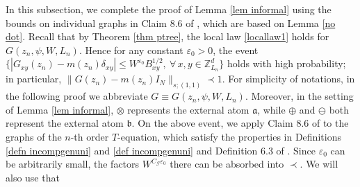 \documentclass{article}
\newcommand{\1}{\mathds{1}}
\numberwithin{equation}{section}
\newcommand{\be}{\begin{equation}}
\newcommand{\ee}{\end{equation}}
\newcommand{\e}{{\varepsilon}}
\newcommand{\fa}{{\mathfrak a}}
\newcommand{\fb}{{\mathfrak b}}
\renewcommand{\cal}{\mathcal}
\newcommand{\wt}{\widetilde}
\renewcommand{\leq}{\leqslant}
\renewcommand{\le}{\leq}
\newcommand{\E}{\mathbb{E}}
\newcommand{\Z}{\mathbb{Z}}
\DeclareMathOperator{\im}{Im}
\DeclareMathOperator{\OO}{O}
\theoremstyle{plain} %
\theoremstyle{remark}
\newcommand{\incomp}{{\text{$T$-equation}}}
\begin{document}
In this subsection, we complete the proof of Lemma \ref{lem informal} using the bounds on individual graphs in Claim 8.6 of \cite{PartII_high}, which are based on Lemma \ref{no dot}. Recall that by Theorem \ref{thm ptree}, the local law \eqref{locallaw1} holds for $G(z_n, \psi, W, L_n)$. Hence for any constant $\e_0>0$, the event $\{|G_{xy}(z_n)-m(z_n)\delta_{xy}|\le W^{\e_0}B_{xy}^{1/2},\ \forall\, x,y\in \Z_{L_n}^d\}$ holds with high probability; in particular, $\|G(z_n)-m(z_n)I_N\|_{s;(1,1)}\prec 1$. For simplicity of notations, in the following proof we abbreviate $G\equiv G(z_n, \psi, W, L_n)$. Moreover, in the setting of Lemma \ref{lem informal}, $\otimes$ represents the external atom $\fa$, while $\oplus$ and $\ominus$ both represent the external atom $\fb$. On the above event, we apply Claim 8.6 of \cite{PartII_high} to the graphs of the $n$-th order $\incomp$, which satisfy the properties in Definitions \ref{defn incompgenuni} and \ref{def incompgenuni} and Definition 6.3 of \cite{PartII_high}. Since $\e_0$ can be arbitrarily small, the factors $W^{C_{\cal G}\e_0}$ there can be absorbed into $\prec$. We will also use that
\end{document}
